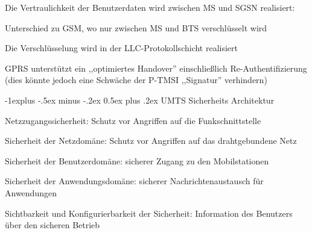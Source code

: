\documentclass[a4paper]{article}
\makeatletter
\renewcommand{\subsection}{\@startsection{subsection}{2}{0mm}%
 {-1explus -.5ex minus -.2ex}%
 {0.5ex plus .2ex}%
 {\normalfont\normalsize\bfseries}}
\makeatother
\begin{document}
\begin{multicols}{3}
\begin{itemize*}
\begin{itemize*}
\begin{itemize*}
                  \end{itemize*}
                  \item Die Vertraulichkeit der Benutzerdaten wird zwischen MS und SGSN realisiert:
                  \begin{itemize*}
                        \item Unterschied zu GSM, wo nur zwischen MS und BTS verschlüsselt wird
                        \item Die Verschlüsselung wird in der LLC-Protokollschicht realisiert
                  \end{itemize*}
            \end{itemize*}
      \end{itemize*}

      \begin{itemize*}
            \item GPRS unterstützt ein ,,optimiertes Handover'' einschließlich Re-Authentifizierung (dies könnte jedoch eine Schwäche der P-TMSI ,,Signatur'' verhindern)
      \end{itemize*}

      \subsection{UMTS Sicherheits Architektur}
      \begin{enumerate*}
            \item Netzzugangssicherheit: Schutz vor Angriffen auf die Funkschnittstelle
            \item Sicherheit der Netzdomäne: Schutz vor Angriffen auf das drahtgebundene Netz
            \item Sicherheit der Benutzerdomäne: sicherer Zugang zu den Mobilstationen
            \item Sicherheit der Anwendungsdomäne: sicherer Nachrichtenaustausch für Anwendungen
            \item Sichtbarkeit und Konfigurierbarkeit der Sicherheit: Information des Benutzers über den sicheren Betrieb
      \end{enumerate*}


\end{multicols}
\end{document}
